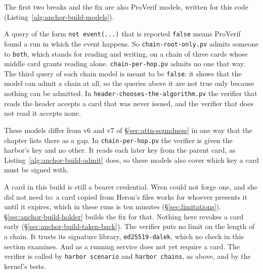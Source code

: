 The first two breaks and the fix are also ProVerif models, written for
this code (Listing~\ref{alg:anchor-build-models}).


A query of the form \texttt{not event(...)} that is reported \texttt{false}
means ProVerif found a run in which the event happens. So
\texttt{chain-root-only.pv} admits someone to \texttt{both}, which stands
for reading and writing, on a chain of three cards whose middle card grants
reading alone. \texttt{chain-per-hop.pv} admits no one that way. The third
query of each chain model is meant to be \texttt{false}: it shows that the
model can admit a chain at all, so the queries above it are not true only
because nothing can be admitted. In
\texttt{header-chooses-the-algorithm.pv} the verifier that reads the header
accepts a card that was never issued, and the verifier that does not read it
accepts none.

These models differ from v6 and v7 of \S\ref{sec:attn-soundness} in one way
that the chapter lists there as a gap. In \texttt{chain-per-hop.pv} the
verifier is given the harbor's key and no other. It reads each later key
from the parent card, as Listing~\ref{alg:anchor-build-admit} does, so these
models also cover which key a card must be signed with.

\begin{pdboundary}
\setlength{\parskip}{4pt plus 1pt}
A card in this build is still a bearer credential. Wren could not forge
one, and she did not need to: a card copied from Heron's files works for
whoever presents it until it expires, which in these runs is ten minutes
(\S\ref{sec:limitations}). \S\ref{sec:anchor-build-holder} builds the fix
for that. Nothing here revokes a card early
(\S\ref{sec:anchor-build-taken-back}). The verifier puts no limit on the length of a
chain. It trusts its signature library, \texttt{ed25519-dalek}, which no
check in this section examines. And \pdkernelname{} as a running service
does not yet require a card. The verifier is called by \texttt{harbor
scenario} and \texttt{harbor chains}, as above, and by the kernel's tests.
\end{pdboundary}

